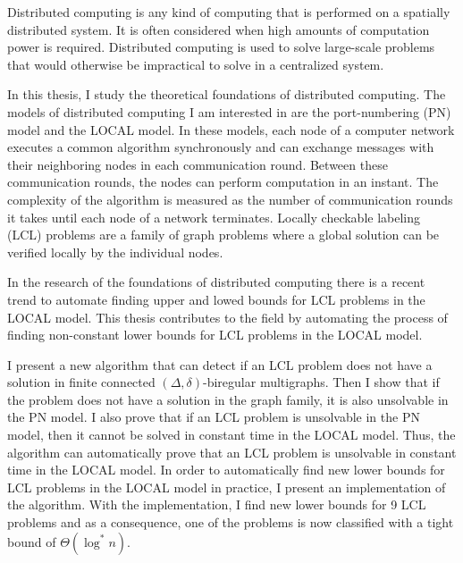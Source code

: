 \begin{abstractpage}[english]
Distributed computing is any kind of computing that is performed on a spatially distributed system.
It is often considered when high amounts of computation power is required.
Distributed computing is used to solve large-scale problems that would otherwise be impractical to solve in a centralized system.

In this thesis, I study the theoretical foundations of distributed computing.
The models of distributed computing I am interested in are the port-numbering (PN) model and the LOCAL model.
In these models, each node of a computer network executes a common algorithm synchronously and can exchange messages with their neighboring nodes in each communication round.
Between these communication rounds, the nodes can perform computation in an instant.
The complexity of the algorithm is measured as the number of communication rounds it takes until each node of a network terminates.
Locally checkable labeling (LCL) problems are a family of graph problems where a global solution can be verified locally by the individual nodes.

In the research of the foundations of distributed computing there is a recent trend to automate finding upper and lowed bounds for LCL problems in the LOCAL model.
This thesis contributes to the field by automating the process of finding non-constant lower bounds for LCL problems in the LOCAL model.

I present a new algorithm that can detect if an LCL problem does not have a solution in finite connected $(\Delta, \delta)$-biregular multigraphs.
Then I show that if the problem does not have a solution in the graph family, it is also unsolvable in the PN model.
I also prove that if an LCL problem is unsolvable in the PN model, then it cannot be solved in constant time in the LOCAL model.
Thus, the algorithm can automatically prove that an LCL problem is unsolvable in constant time in the LOCAL model.
In order to automatically find new lower bounds for LCL problems in the LOCAL model in practice, I present an implementation of the algorithm.
With the implementation, I find new lower bounds for 9 LCL problems and as a consequence, one of the problems is now classified with a tight bound of $\Theta(\log^* n)$.

\end{abstractpage}
